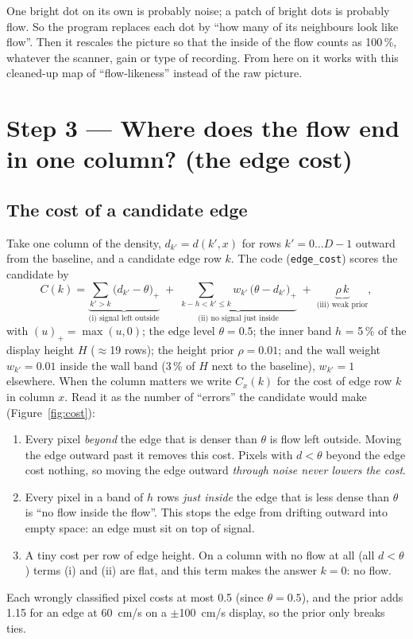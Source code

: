 \documentclass[11pt,a4paper]{article}
\newcommand{\code}[1]{\texttt{\small #1}}
\begin{document}
\begin{plainbox}
One bright dot on its own is probably noise; a patch of bright dots is probably flow. So the program replaces each
dot by ``how many of its neighbours look like flow''. Then it rescales the picture so that the inside of the flow
counts as 100\,\%, whatever the scanner, gain or type of recording. From here on it works with this cleaned-up map of
``flow-likeness'' instead of the raw picture.
\end{plainbox}

\section{Step 3 --- Where does the flow end in one column? (the edge cost)}
\label{sec:cost}

\subsection{The cost of a candidate edge}
Take one column of the density, $d_{k'} = d(k', x)$ for rows $k' = 0\dots D-1$ outward from the baseline, and a
candidate edge row $k$. The code (\code{edge\_cost}) scores the candidate by
\begin{equation}
C(k) = \underbrace{\sum_{k'>k} \big(d_{k'} - \theta\big)_+}_{\text{(i) signal left outside}}
\;+\; \underbrace{\sum_{k-h<k'\le k} w_{k'}\,\big(\theta - d_{k'}\big)_+}_{\text{(ii) no signal just inside}}
\;+\; \underbrace{\rho\,k}_{\text{(iii) weak prior}},
\label{eq:cost}
\end{equation}
with $(u)_+ = \max(u, 0)$; the edge level $\theta = 0.5$; the inner band $h$ = 5\,\% of the display height $H$
($\approx$19 rows); the height prior $\rho = 0.01$; and the wall weight $w_{k'} = 0.01$ inside the wall band (3\,\% of
$H$ next to the baseline), $w_{k'} = 1$ elsewhere. When the column matters we write $C_x(k)$ for the cost of edge
row $k$ in column $x$.
Read it as the number of ``errors'' the candidate would make (Figure~\ref{fig:cost}):
\begin{enumerate}[label=(\roman*)]
\item Every pixel \emph{beyond} the edge that is denser than $\theta$ is flow left outside. Moving the edge outward past
it removes this cost. Pixels with $d < \theta$ beyond the edge cost nothing, so moving the edge outward
\emph{through noise never lowers the cost}.
\item Every pixel in a band of $h$ rows \emph{just inside} the edge that is less dense than $\theta$ is ``no flow inside
the flow''. This stops the edge from drifting outward into empty space: an edge must sit on top of signal.
\item A tiny cost per row of edge height. On a column with no flow at all (all $d < \theta$) terms (i) and (ii) are
flat, and this term makes the answer $k = 0$: no flow.
\end{enumerate}
Each wrongly classified pixel costs at most 0.5 (since $\theta = 0.5$), and the prior adds 1.15 for an edge at
60~cm/s on a $\pm$100~cm/s display, so the prior only breaks ties.
\end{document}
